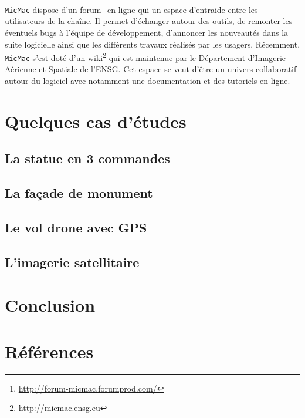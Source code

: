 \documentclass[a4paper,10pt]{article} %
\begin{document}
{\tt MicMac} dispose d'un forum\footnote{\url{http://forum-micmac.forumprod.com/}} en ligne qui un espace d'entraide entre les utilisateurs de la chaîne. Il permet d'échanger autour des outils, de remonter les éventuels bugs à l'équipe de développement, d'annoncer les nouveautés dans la suite logicielle ainsi que les différents travaux réalisés par les usagers. Récemment, {\tt MicMac} s'est doté d'un wiki\footnote{\url{http://micmac.ensg.eu}} qui est maintenue par le Département d'Imagerie Aérienne et Spatiale de l'ENSG. Cet espace se veut d'être un univers collaboratif autour du logiciel avec notamment une documentation et des tutoriels en ligne. 

\section{Quelques cas d'études}
\subsection{La statue en 3 commandes}
\subsection{La façade de monument}
\subsection{Le vol drone avec GPS}
\subsection{L'imagerie satellitaire}
\section*{Conclusion}

\section*{Références}
\nocite{*}

\end{document}
